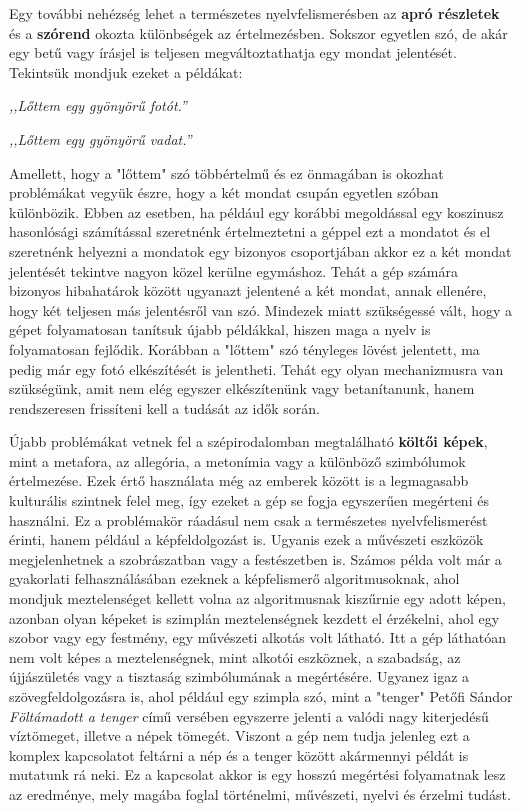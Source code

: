 Egy további nehézség lehet a természetes nyelvfelismerésben az \textbf{apró részletek} és a \textbf{szórend} okozta különbségek az értelmezésben. Sokszor egyetlen szó, de akár egy betű vagy írásjel is teljesen megváltoztathatja egy mondat jelentését. Tekintsük mondjuk ezeket a példákat:

\vspace{0.5cm}
\centerline{\textit{,,Lőttem egy gyönyörű fotót.''}}
\centerline{\textit{,,Lőttem egy gyönyörű vadat.''}}
\vspace{0.5cm}

Amellett, hogy a "lőttem" szó többértelmű és ez önmagában is okozhat problémákat vegyük észre, hogy a két mondat csupán egyetlen szóban különbözik. Ebben az esetben, ha például egy korábbi megoldással egy koszinusz hasonlósági számítással szeretnénk értelmeztetni a géppel ezt a mondatot és el szeretnénk helyezni a mondatok egy bizonyos csoportjában akkor ez a két mondat jelentését tekintve nagyon közel kerülne egymáshoz. Tehát a gép számára bizonyos hibahatárok között ugyanazt jelentené a két mondat, annak ellenére, hogy két teljesen más jelentésről van szó. Mindezek miatt szükségessé vált, hogy a gépet folyamatosan tanítsuk újabb példákkal, hiszen maga a nyelv is folyamatosan fejlődik. Korábban a "lőttem" szó tényleges lövést jelentett, ma pedig már egy fotó elkészítését is jelentheti. Tehát egy olyan mechanizmusra van szükségünk, amit nem elég egyszer elkészítenünk vagy betanítanunk, hanem rendszeresen frissíteni kell a tudását az idők során.

Újabb problémákat vetnek fel a szépirodalomban megtalálható \textbf{költői képek}, mint a metafora, az allegória, a metonímia vagy a különböző szimbólumok értelmezése. Ezek értő használata még az emberek között is a legmagasabb kulturális szintnek felel meg, így ezeket a gép se fogja egyszerűen megérteni és használni. Ez a problémakör ráadásul nem csak a természetes nyelvfelismerést érinti, hanem például a  képfeldolgozást is. Ugyanis ezek a művészeti eszközök megjelenhetnek a szobrászatban vagy a festészetben is. Számos példa volt már a gyakorlati felhasználásában ezeknek a képfelismerő algoritmusoknak, ahol mondjuk meztelenséget kellett volna az algoritmusnak kiszűrnie egy adott képen, azonban olyan képeket is szimplán meztelenségnek kezdett el érzékelni, ahol egy szobor vagy egy festmény, egy művészeti alkotás volt látható. Itt a gép láthatóan nem volt képes a meztelenségnek, mint alkotói eszköznek, a szabadság, az újjászületés vagy a tisztaság szimbólumának a megértésére. Ugyanez igaz a szövegfeldolgozásra is, ahol például egy szimpla szó, mint a "tenger" Petőfi Sándor \textit{Föltámadott a tenger} című versében egyszerre jelenti a valódi nagy kiterjedésű víztömeget, illetve a népek tömegét. Viszont a gép nem tudja jelenleg ezt a komplex kapcsolatot feltárni a nép és a tenger között akármennyi példát is mutatunk rá neki. Ez a kapcsolat akkor is egy hosszú megértési folyamatnak lesz az eredménye, mely magába foglal történelmi, művészeti, nyelvi és érzelmi tudást.
